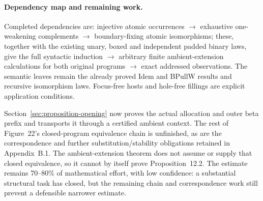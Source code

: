 





\paragraph{Dependency map and remaining work.}
Completed dependencies are: injective atomic occurrences $\to$ exhaustive
one-weakening complements $\to$ boundary-fixing atomic isomorphisms; these,
together with the existing unary, boxed and independent padded binary laws,
give the full syntactic induction $\to$ arbitrary finite ambient-extension
calculations for both original programs $\to$ exact addressed observations.
The semantic leaves remain the already proved Idem and BPullW results and
recursive isomorphism laws. Focus-free hosts and hole-free fillings are
explicit application conditions.

Section~\ref{sec:proposition-opening} now proves the actual allocation and outer
beta prefix and transports it through a certified ambient context. The rest
of Figure~22's closed-program equivalence chain is unfinished, as are the
correspondence and further substitution/stability obligations retained in
Appendix~B.1. The ambient-extension theorem does not assume or supply that
closed equivalence, so it cannot by itself prove Proposition~12.2. The estimate
remains 70--80\% of mathematical effort, with low confidence: a substantial
structural task has closed, but the remaining chain and correspondence work
still prevent a defensible narrower estimate.
